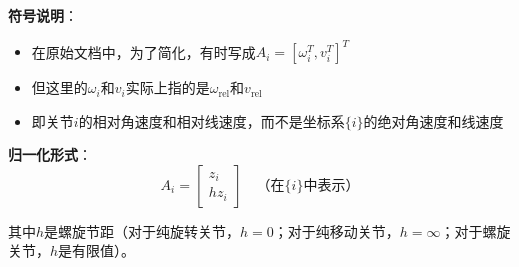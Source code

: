 \documentclass[12pt,a4paper]{article}
\begin{document}
\textbf{符号说明}：
\begin{itemize}
\item 在原始文档中，为了简化，有时写成$A_i = [\omega_i^T, v_i^T]^T$
\item 但这里的$\omega_i$和$v_i$实际上指的是$\omega_{\text{rel}}$和$v_{\text{rel}}$
\item 即关节$i$的相对角速度和相对线速度，而不是坐标系$\{i\}$的绝对角速度和线速度
\end{itemize}

\textbf{归一化形式}：
\begin{equation}
A_i = \begin{bmatrix} z_i \\ h z_i \end{bmatrix} \quad \text{（在$\{i\}$中表示）}
\end{equation}

其中$h$是螺旋节距（对于纯旋转关节，$h = 0$；对于纯移动关节，$h = \infty$；对于螺旋关节，$h$是有限值）。
\end{document}
